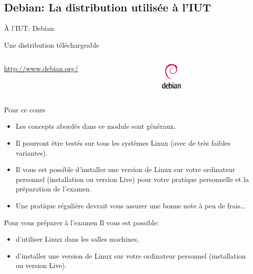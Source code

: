 \subsection{Debian: La distribution utilisée à l'IUT}
\begin{frame}{À l'IUT: Debian}
  \begin{block}{Une distribution téléchargeable}
    \begin{columns}
      \begin{column}{8cm}
        \url{http://www.debian.org/}\\
      \end{column}
      \begin{column}{3cm}
        \includegraphics[width=1cm]{img/s01/openlogo-100.png}
      \end{column}
    \end{columns}
  \end{block}
  \begin{block}{Pour ce cours}
    \begin{itemize}
    \item Les concepts abordés dans ce module sont généraux.
    \item Il pourront être testés sur tous les systèmes Linux (avec de très faibles variantes).
    \item Il vous est possible d'installer une version de Linux sur votre ordinateur personnel (installation ou version Live) pour votre pratique personnelle et la préparation de l'examen.
    \item Une pratique régulière devrait vous assurer une bonne note à peu de frais\dots
    \end{itemize}
  \end{block}
  \begin{alertblock}{Pour vous préparer à l'examen}
    Il vous est possible:
    \begin{itemize}
    \item d'utiliser Linux dans les salles machines,
    \item d'installer une version de Linux sur votre ordinateur personnel (installation ou version Live).
    \end{itemize}
  \end{alertblock}
\end{frame}

